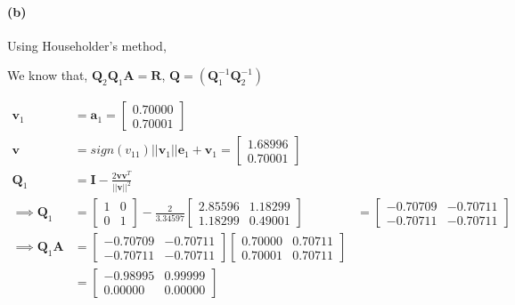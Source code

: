 \documentclass[12pt, letterpaper]{article}
\begin{document}
\paragraph{(b)} Using Householder's method,

We know that, $\mathbf{Q}_2\mathbf{Q}_1\mathbf{A} = \mathbf{R}$, $\mathbf{Q} = (\mathbf{Q}_1^{-1}\mathbf{Q}_2^{-1})$

\begin{align*}
  \mathbf{v}_1 &= \mathbf{a}_1 = \begin{bmatrix} 0.70000 \\ 0.70001 \end{bmatrix}\\
  \mathbf{v} &= sign(v_{11})||\mathbf{v}_1||\mathbf{e}_1 + \mathbf{v}_1
  = \begin{bmatrix} 1.68996 \\ 0.70001 \end{bmatrix}                           \\ 
  \mathbf{Q}_1 &= \mathbf{I} - \frac{2\mathbf{v}\mathbf{v}^T}{||\mathbf{v}||^2}\\
  \implies \mathbf{Q}_1 &= \begin{bmatrix} 1 & 0 \\ 0 & 1 \end{bmatrix}
                 - \frac{2}{3.34597}
                 \begin{bmatrix}
                   2.85596 & 1.18299 \\ 1.18299 & 0.49001
                 \end{bmatrix}
               &= \begin{bmatrix}
                   -0.70709 & -0.70711 \\ -0.70711 & -0.70711
                 \end{bmatrix}\\
  \implies \mathbf{Q}_1\mathbf{A} &= \begin{bmatrix}
                   -0.70709 & -0.70711 \\ -0.70711 & -0.70711
                 \end{bmatrix}\begin{bmatrix} 
                    0.70000  & 0.70711 \\ 0.70001  & 0.70711
                  \end{bmatrix}\\
  &= \begin{bmatrix} 
      -0.98995  & 0.99999 \\ 0.00000  & 0.00000
    \end{bmatrix}\\

\end{align*}
\end{document}
